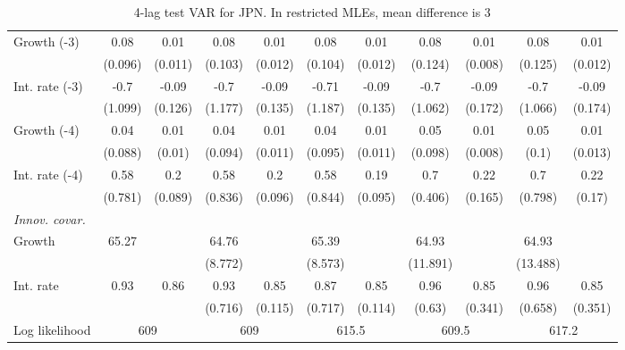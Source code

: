 \begin{table}[htbp]
\begin{tabular}{@{\extracolsep{4pt}}lcccccccccc@{}}
\quad Growth (-3) 	 &0.08 	 & 0.01 	 & 0.08 	 & 0.01 	 & 0.08 	 & 0.01 	 & 0.08 	 & 0.01 	 & 0.08 	 & 0.01	 \\ 
 		 & (0.096) 	 & (0.011) 	 & (0.103) 	 & (0.012) 	 & (0.104) 	 & (0.012) 	 & (0.124) 	 & (0.008) 	 & (0.125) 	 & (0.012) 	 \\ 
\quad Int. rate (-3) 	 &-0.7 	 & -0.09 	 & -0.7 	 & -0.09 	 & -0.71 	 & -0.09 	 & -0.7 	 & -0.09 	 & -0.7 	 & -0.09	 \\ 
 		 & (1.099) 	 & (0.126) 	 & (1.177) 	 & (0.135) 	 & (1.187) 	 & (0.135) 	 & (1.062) 	 & (0.172) 	 & (1.066) 	 & (0.174) 	 \\ 
\quad Growth (-4) 	 &0.04 	 & 0.01 	 & 0.04 	 & 0.01 	 & 0.04 	 & 0.01 	 & 0.05 	 & 0.01 	 & 0.05 	 & 0.01	 \\ 
 		 & (0.088) 	 & (0.01) 	 & (0.094) 	 & (0.011) 	 & (0.095) 	 & (0.011) 	 & (0.098) 	 & (0.008) 	 & (0.1) 	 & (0.013) 	 \\ 
\quad Int. rate (-4) 	 &0.58 	 & 0.2 	 & 0.58 	 & 0.2 	 & 0.58 	 & 0.19 	 & 0.7 	 & 0.22 	 & 0.7 	 & 0.22	 \\ 
 		 & (0.781) 	 & (0.089) 	 & (0.836) 	 & (0.096) 	 & (0.844) 	 & (0.095) 	 & (0.406) 	 & (0.165) 	 & (0.798) 	 & (0.17) 	 \\ 
\rule{0pt}{4ex} \emph{Innov. covar.}  	 & 	 & 	 & 	 & 	 & 	 & 	 & 	 & 	 & 	 &\\ 
\quad Growth 	 &65.27 	 &  	 & 64.76 	 &  	 & 65.39 	 &  	 & 64.93 	 &  	 & 64.93 	 & 	 \\ 
 		 &  	 &  	 & (8.772) 	 &  	 & (8.573) 	 &  	 & (11.891) 	 &  	 & (13.488) 	 &  	 \\ 
\quad Int. rate 	 &0.93 	 & 0.86 	 & 0.93 	 & 0.85 	 & 0.87 	 & 0.85 	 & 0.96 	 & 0.85 	 & 0.96 	 & 0.85	 \\ 
 		 &  	 &  	 & (0.716) 	 & (0.115) 	 & (0.717) 	 & (0.114) 	 & (0.63) 	 & (0.341) 	 & (0.658) 	 & (0.351) 	 \\ 
 \hline \rule{0pt}{4ex} 
  Log likelihood 	 &\multicolumn{2}{c}{609} 	 & \multicolumn{2}{c}{609} 	 & \multicolumn{2}{c}{615.5} 	 & \multicolumn{2}{c}{609.5} 	 & \multicolumn{2}{c}{617.2}\\ 

 \hline 	\end{tabular}		\caption{4-lag test VAR for JPN. In restricted MLEs, mean difference is 3}
		\label{tab:JPN4}

\end{table}